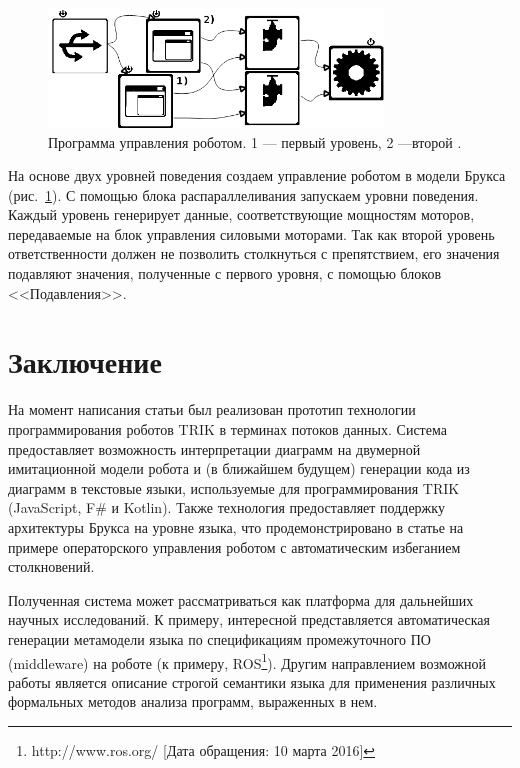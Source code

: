 \documentclass[conference]{IEEEtran}
\begin{document}
\begin{figure}[ht]
	\centering
	\includegraphics[width=3.5in]{programScreen.png}
	\caption{Программа управления роботом. 1 --- первый уровень, 2 ---второй .}
	\label{image:prog}
\end{figure}

На основе двух уровней поведения создаем управление роботом в модели Брукса (рис.~\ref{image:prog}). С помощью блока распараллеливания запускаем уровни поведения. Каждый уровень генерирует данные, соответствующие мощностям моторов, передаваемые на блок управления силовыми моторами. Так как второй уровень ответственности должен не позволить столкнуться с препятствием, его значения подавляют значения, полученные с первого уровня, с помощью блоков <<Подавления>>.


\section{Заключение}
\label{sec:conclusion}
На момент написания статьи был реализован прототип технологии программирования роботов TRIK в терминах потоков данных. Система предоставляет возможность интерпретации диаграмм на двумерной имитационной модели робота и (в ближайшем будущем) генерации кода из диаграмм в текстовые языки, используемые для программирования TRIK (JavaScript, F\# и Kotlin). Также технология предоставляет поддержку архитектуры Брукса на уровне языка, что продемонстрировано в статье на примере операторского управления роботом с автоматическим избеганием столкновений.

Полученная система может рассматриваться как платформа для дальнейших научных исследований. К примеру, интересной представляется автоматическая генерации метамодели языка по спецификациям промежуточного ПО (middleware) на роботе (к примеру, ROS\footnote{http://www.ros.org/ [Дата обращения: 10 марта 2016]}). Другим направлением возможной работы является описание строгой семантики языка для применения различных формальных методов анализа программ, выраженных в нем.

\newpage


\end{document}
